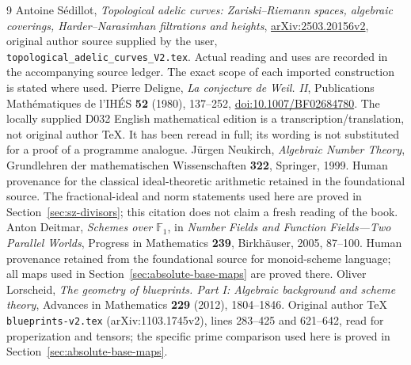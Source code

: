 \documentclass[11pt,a4paper]{article}
\theoremstyle{definition}\newtheorem{definition}[theorem]{Definition}
\begin{document}
\begin{thebibliography}{9}
 Antoine S\'edillot, \emph{Topological adelic curves: Zariski--Riemann spaces, algebraic coverings, Harder--Narasimhan filtrations and heights}, \href{https://arxiv.org/abs/2503.20156v2}{arXiv:2503.20156v2}, original author source supplied by the user, \texttt{topological\_adelic\_curves\_V2.tex}. Actual reading and uses are recorded in the accompanying source ledger. The exact scope of each imported construction is stated where used.
 Pierre Deligne, \emph{La conjecture de Weil. II}, Publications Math\'ematiques de l'IH\'ES \textbf{52} (1980), 137--252, \href{https://doi.org/10.1007/BF02684780}{doi:10.1007/BF02684780}. The locally supplied D032 English mathematical edition is a transcription/translation, not original author TeX. It has been reread in full; its wording is not substituted for a proof of a programme analogue.
 J\"urgen Neukirch, \emph{Algebraic Number Theory}, Grundlehren der mathematischen Wissenschaften \textbf{322}, Springer, 1999. Human provenance for the classical ideal-theoretic arithmetic retained in the foundational source. The fractional-ideal and norm statements used here are proved in Section~\ref{sec:sz-divisors}; this citation does not claim a fresh reading of the book.
 Anton Deitmar, \emph{Schemes over $\mathbb F_1$}, in \emph{Number Fields and Function Fields---Two Parallel Worlds}, Progress in Mathematics \textbf{239}, Birkh\"auser, 2005, 87--100. Human provenance retained from the foundational source for monoid-scheme language; all maps used in Section~\ref{sec:absolute-base-maps} are proved there.
 Oliver Lorscheid, \emph{The geometry of blueprints. Part I: Algebraic background and scheme theory}, Advances in Mathematics \textbf{229} (2012), 1804--1846. Original author TeX \texttt{blueprints-v2.tex} (arXiv:1103.1745v2), lines 283--425 and 621--642, read for properization and tensors; the specific prime comparison used here is proved in Section~\ref{sec:absolute-base-maps}.


\end{thebibliography}
\end{document}
